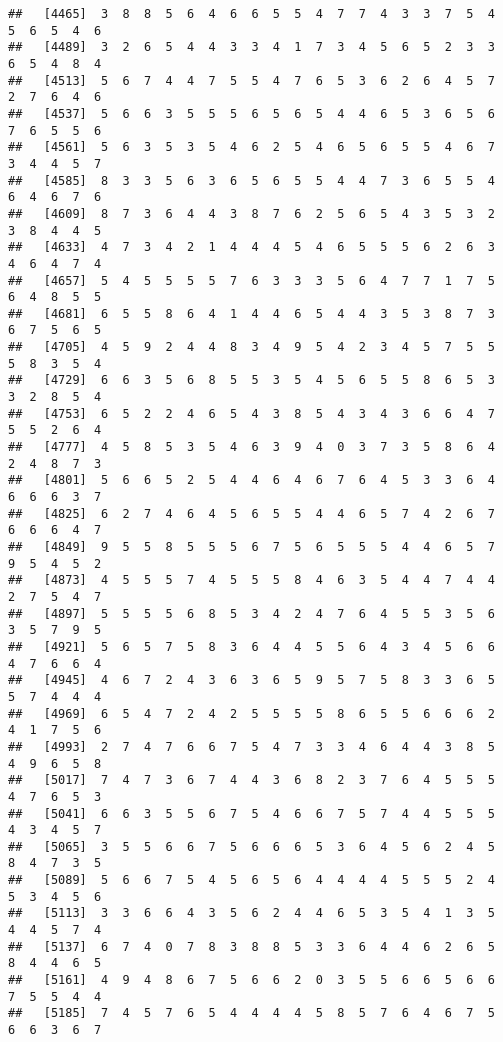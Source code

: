 \documentclass[
]{book}
\begin{document}
\begin{verbatim}
##   [4465]  3  8  8  5  6  4  6  6  5  5  4  7  7  4  3  3  7  5  4  5  6  5  4  6
##   [4489]  3  2  6  5  4  4  3  3  4  1  7  3  4  5  6  5  2  3  3  6  5  4  8  4
##   [4513]  5  6  7  4  4  7  5  5  4  7  6  5  3  6  2  6  4  5  7  2  7  6  4  6
##   [4537]  5  6  6  3  5  5  5  6  5  6  5  4  4  6  5  3  6  5  6  7  6  5  5  6
##   [4561]  5  6  3  5  3  5  4  6  2  5  4  6  5  6  5  5  4  6  7  3  4  4  5  7
##   [4585]  8  3  3  5  6  3  6  5  6  5  5  4  4  7  3  6  5  5  4  6  4  6  7  6
##   [4609]  8  7  3  6  4  4  3  8  7  6  2  5  6  5  4  3  5  3  2  3  8  4  4  5
##   [4633]  4  7  3  4  2  1  4  4  4  5  4  6  5  5  5  6  2  6  3  4  6  4  7  4
##   [4657]  5  4  5  5  5  5  7  6  3  3  3  5  6  4  7  7  1  7  5  6  4  8  5  5
##   [4681]  6  5  5  8  6  4  1  4  4  6  5  4  4  3  5  3  8  7  3  6  7  5  6  5
##   [4705]  4  5  9  2  4  4  8  3  4  9  5  4  2  3  4  5  7  5  5  5  8  3  5  4
##   [4729]  6  6  3  5  6  8  5  5  3  5  4  5  6  5  5  8  6  5  3  3  2  8  5  4
##   [4753]  6  5  2  2  4  6  5  4  3  8  5  4  3  4  3  6  6  4  7  5  5  2  6  4
##   [4777]  4  5  8  5  3  5  4  6  3  9  4  0  3  7  3  5  8  6  4  2  4  8  7  3
##   [4801]  5  6  6  5  2  5  4  4  6  4  6  7  6  4  5  3  3  6  4  6  6  6  3  7
##   [4825]  6  2  7  4  6  4  5  6  5  5  4  4  6  5  7  4  2  6  7  6  6  6  4  7
##   [4849]  9  5  5  8  5  5  5  6  7  5  6  5  5  5  4  4  6  5  7  9  5  4  5  2
##   [4873]  4  5  5  5  7  4  5  5  5  8  4  6  3  5  4  4  7  4  4  2  7  5  4  7
##   [4897]  5  5  5  5  6  8  5  3  4  2  4  7  6  4  5  5  3  5  6  3  5  7  9  5
##   [4921]  5  6  5  7  5  8  3  6  4  4  5  5  6  4  3  4  5  6  6  4  7  6  6  4
##   [4945]  4  6  7  2  4  3  6  3  6  5  9  5  7  5  8  3  3  6  5  5  7  4  4  4
##   [4969]  6  5  4  7  2  4  2  5  5  5  5  8  6  5  5  6  6  6  2  4  1  7  5  6
##   [4993]  2  7  4  7  6  6  7  5  4  7  3  3  4  6  4  4  3  8  5  4  9  6  5  8
##   [5017]  7  4  7  3  6  7  4  4  3  6  8  2  3  7  6  4  5  5  5  4  7  6  5  3
##   [5041]  6  6  3  5  5  6  7  5  4  6  6  7  5  7  4  4  5  5  5  4  3  4  5  7
##   [5065]  3  5  5  6  6  7  5  6  6  6  5  3  6  4  5  6  2  4  5  8  4  7  3  5
##   [5089]  5  6  6  7  5  4  5  6  5  6  4  4  4  4  5  5  5  2  4  5  3  4  5  6
##   [5113]  3  3  6  6  4  3  5  6  2  4  4  6  5  3  5  4  1  3  5  4  4  5  7  4
##   [5137]  6  7  4  0  7  8  3  8  8  5  3  3  6  4  4  6  2  6  5  8  4  4  6  5
##   [5161]  4  9  4  8  6  7  5  6  6  2  0  3  5  5  6  6  5  6  6  7  5  5  4  4
##   [5185]  7  4  5  7  6  5  4  4  4  4  5  8  5  7  6  4  6  7  5  6  6  3  6  7

\end{verbatim}
\end{document}
